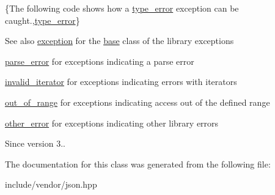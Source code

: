 \{The following code shows how a {\ttfamily \mbox{\hyperlink{classnlohmann_1_1detail_1_1type__error}{type\+\_\+error}}} exception can be caught.,\mbox{\hyperlink{classnlohmann_1_1detail_1_1type__error}{type\+\_\+error}}\}

\begin{DoxySeeAlso}{See also}
\mbox{\hyperlink{classnlohmann_1_1detail_1_1exception}{exception}} for the \mbox{\hyperlink{namespacebase}{base}} class of the library exceptions 

\mbox{\hyperlink{classnlohmann_1_1detail_1_1parse__error}{parse\+\_\+error}} for exceptions indicating a parse error 

\mbox{\hyperlink{classnlohmann_1_1detail_1_1invalid__iterator}{invalid\+\_\+iterator}} for exceptions indicating errors with iterators 

\mbox{\hyperlink{classnlohmann_1_1detail_1_1out__of__range}{out\+\_\+of\+\_\+range}} for exceptions indicating access out of the defined range 

\mbox{\hyperlink{classnlohmann_1_1detail_1_1other__error}{other\+\_\+error}} for exceptions indicating other library errors
\end{DoxySeeAlso}
\begin{DoxySince}{Since}
version 3.. 
\end{DoxySince}


The documentation for this class was generated from the following file\+:\begin{DoxyCompactItemize}
\item 
include/vendor/json.\+hpp\end{DoxyCompactItemize}
